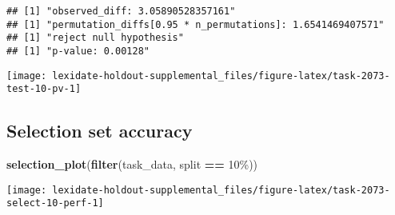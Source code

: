 \documentclass[
]{book}
\newenvironment{Shaded}{\begin{snugshade}}{\end{snugshade}}
\newcommand{\AttributeTok}[1]{\textcolor[rgb]{0.13,0.29,0.53}{#1}}
\newcommand{\DecValTok}[1]{\textcolor[rgb]{0.00,0.00,0.81}{#1}}
\newcommand{\FunctionTok}[1]{\textcolor[rgb]{0.13,0.29,0.53}{\textbf{#1}}}
\newcommand{\NormalTok}[1]{#1}
\newcommand{\OtherTok}[1]{\textcolor[rgb]{0.56,0.35,0.01}{#1}}
\newcommand{\SpecialCharTok}[1]{\textcolor[rgb]{0.81,0.36,0.00}{\textbf{#1}}}
\newcommand{\StringTok}[1]{\textcolor[rgb]{0.31,0.60,0.02}{#1}}
\begin{document}
\begin{Shaded}
\end{Shaded}

\begin{verbatim}
## [1] "observed_diff: 3.05890528357161"
## [1] "permutation_diffs[0.95 * n_permutations]: 1.6541469407571"
## [1] "reject null hypothesis"
## [1] "p-value: 0.00128"
\end{verbatim}

\texttt{[image: lexidate-holdout-supplemental\_files/figure-latex/task-2073-test-10-pv-1]}

\hypertarget{selection-set-accuracy-41}{%
\subsection{Selection set accuracy}\label{selection-set-accuracy-41}}

\begin{Shaded}
\begin{Highlighting}[]
\FunctionTok{selection\_plot}\NormalTok{(}\FunctionTok{filter}\NormalTok{(task\_data, split }\SpecialCharTok{==} \StringTok{\textquotesingle{}10\%\textquotesingle{}}\NormalTok{))}
\end{Highlighting}
\end{Shaded}

\texttt{[image: lexidate-holdout-supplemental\_files/figure-latex/task-2073-select-10-perf-1]}
\end{document}
